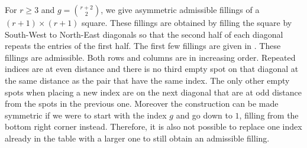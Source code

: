\documentclass[11pt]{amsart}
\theoremstyle{definition}
\theoremstyle{definition}
\begin{document}
For $r\geq 3$ and $g={r+2 \choose 2}$, we give asymmetric admissible fillings of a $(r+1)\times (r+1)$ square. 
These fillings are obtained by filling the square by South-West to North-East diagonals so that the second half of each diagonal repeats the entries of the first half.
 The first few fillings are given in . 
 These fillings are admissible.
 Both rows and columns are in increasing order. 
 Repeated indices are at even distance and there is no third empty spot on that diagonal at the same distance as the pair that have the same index. 
 The only other empty spots when placing a new index are on the next diagonal that are at odd distance from the spots in the previous one.
 Moreover the construction can be made symmetric if we were to start with the index $g$ and go down to $1$, filling from the bottom right corner instead. 
 Therefore, it is also not possible to replace one index already in the table with a larger one to still obtain an admissible filling.
\end{document}
